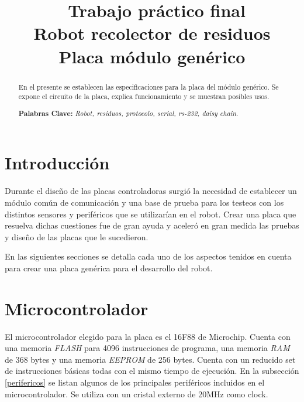 \documentclass[a4paper,10pt]{article}
\begin{document}
\title{{\ Trabajo pr\'actico final \\ Robot recolector de residuos \\ Placa m\'odulo gen\'erico}}



\maketitle

\begin{abstract}
En el presente se establecen las especificaciones para la placa del m\'odulo gen\'erico.
Se expone el circuito de la placa, explica funcionamiento y se muestran posibles usos.

\textbf{Palabras Clave: }\emph{Robot, residuos, protocolo, serial, rs-232, daisy chain}.
\end{abstract}



\section{Introducci\'on}
\label{introduccion}

Durante el dise\~no de las placas controladoras surgi\'o la necesidad de establecer un m\'odulo com\'un de comunicaci\'on y una base de prueba
para los testeos con los distintos sensores y perif\'ericos que se utilizar\'ian en el robot.
Crear una placa que resuelva dichas cuestiones fue de gran ayuda y aceler\'o en gran medida las pruebas y dise\~no de las placas que le sucedieron.

En las siguientes secciones se detalla cada uno de los aspectos tenidos en cuenta para crear una placa gen\'erica para el desarrollo del robot.

\section{Microcontrolador}
\label{microcontrolado}

El microcontrolador elegido para la placa es el 16F88 de Microchip.
Cuenta con una memoria \emph{FLASH} para 4096 instrucciones de programa, una memoria \emph{RAM} de 368 bytes y una memoria \emph{EEPROM} de 256 bytes.
Cuenta con un reducido set de instrucciones b\'asicas todas con el mismo tiempo de ejecuci\'on.
En la subsecci\'on \ref{perifericos} se listan algunos de los principales perif\'ericos incluidos en el microcontrolador.
Se utiliza con un cristal externo de 20MHz como clock.
\end{document}
